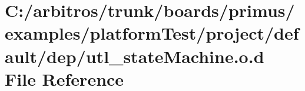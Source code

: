 \hypertarget{platform_test_2project_2default_2dep_2utl__state_machine_8o_8d}{\section{C\-:/arbitros/trunk/boards/primus/examples/platform\-Test/project/default/dep/utl\-\_\-state\-Machine.o.\-d File Reference}
\label{platform_test_2project_2default_2dep_2utl__state_machine_8o_8d}
}
